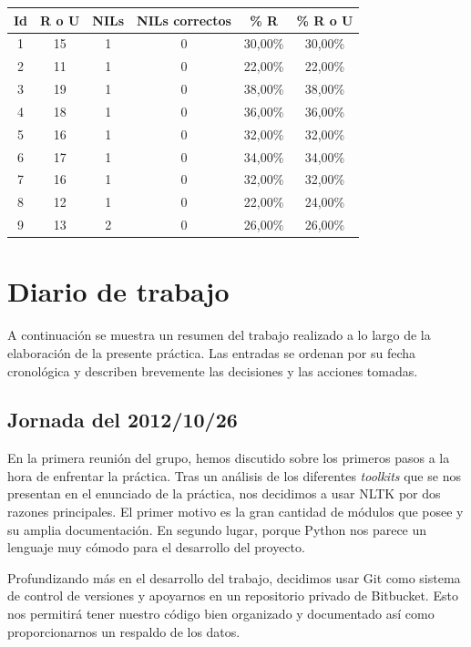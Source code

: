 \documentclass[12pt,a4paper,titlepage]{article}
\begin{document}
\begin{table}[h!]
\begin{center}
\begin{tabular}{|c|c|c|c|c|c|}
\hline
Id & R o U & NILs & NILs correctos & \% R & \% R o U\\ \hline
1 & 15 & 1 & 0 & 30,00\% & 30,00\% \\ \hline
2 & 11 & 1 & 0 & 22,00\% & 22,00\% \\ \hline
3 & 19 & 1 & 0 & 38,00\% & 38,00\% \\ \hline
4 & 18 & 1 & 0 & 36,00\% & 36,00\% \\ \hline
5 & 16 & 1 & 0 & 32,00\% & 32,00\% \\ \hline
6 & 17 & 1 & 0 & 34,00\% & 34,00\% \\ \hline
7 & 16 & 1 & 0 & 32,00\% & 32,00\% \\ \hline
8 & 12 & 1 & 0 & 22,00\% & 24,00\% \\ \hline
9 & 13 & 2 & 0 & 26,00\% & 26,00\% \\ \hline
\end{tabular}
\end{center}
\end{table}






\clearpage
\section{Diario de trabajo}
A continuación se muestra un resumen del trabajo realizado a lo largo de la elaboración de la presente práctica. Las entradas se ordenan por su fecha cronológica y describen brevemente las decisiones y las acciones tomadas.


\subsection{Jornada del 2012/10/26}
En la primera reunión del grupo, hemos discutido sobre los primeros pasos a la hora de enfrentar la práctica. Tras un análisis de los diferentes \emph{toolkits} que se nos presentan en el enunciado de la práctica, nos decidimos a usar NLTK por dos razones principales. El primer motivo es la gran cantidad de módulos que posee y su amplia documentación. En segundo lugar, porque Python nos parece un lenguaje muy cómodo para el desarrollo del proyecto.

Profundizando más en el desarrollo del trabajo, decidimos usar Git como sistema de control de versiones y apoyarnos en un repositorio privado de Bitbucket. Esto nos permitirá tener nuestro código bien organizado y documentado así como proporcionarnos un respaldo de los datos.
\end{document}
